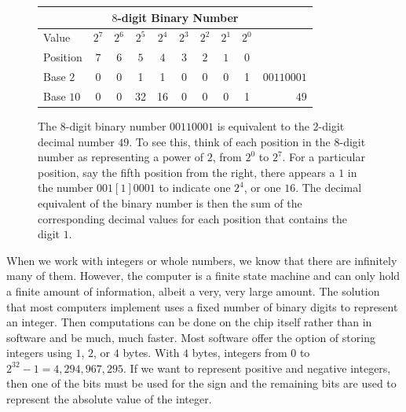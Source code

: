 \begin{figure}
\begin{center}
\begin{tabular}{l|cccccccc|r}
    \multicolumn{10}{c}{$8$-digit Binary Number}  \\
     \hline
 Value & $2^7$ & $2^6$ & $2^5$ & $2^4$ & $2^3$ & $2^2$ & $2^1$ & $2^0$ \\
 \hline
  Position & $7$ & $6$ & $5$ & $4$ & $3$ & $2$ & $1$ & $0$ \\
\hline
  Base $2$ &   0 & 0  & 1 & 1 & 0 & 0 & 0 & 1 & $00110001$\\
\hline
 
 Base $10$  & 0 & 0  & 32 & 16 & 0 & 0 & 0 & 1 & $49$ \\
 \hline
\end{tabular}
\end{center}

\caption{The 8-digit binary number $00110001$ is equivalent to the
  2-digit decimal number $49$.  To see this, think of each position in
  the 8-digit number as representing a power of $2$, from $2^0$ to
  $2^7$. For a particular position, say the fifth position from the
  right, there appears a $1$ in the number $001[1]0001$ to indicate
  one $2^4$, or one $16$. The decimal equivalent of the binary number
  is then the sum of the corresponding decimal values for each
  position that contains the digit $1$.}
\label{fig:base2}
\end{figure}

When we work with integers or whole numbers, we know that there are
infinitely many of them.  However, the computer is a finite state
machine and can only hold a finite amount of information, albeit a
very, very large amount.  The solution that most computers implement
uses a fixed number of binary digits to represent an integer.  Then
computations can be done on the chip itself rather than in software
and be much, much faster. Most software offer the option of storing
integers using $1$, $2$, or $4$ bytes.  With $4$ bytes, integers from
$0$ to $2^{32} - 1 = 4,294,967,295$.  If we want to represent positive
and negative integers, then one of the bits must be used for the sign
and the remaining bits are used to represent the absolute value of the
integer.

